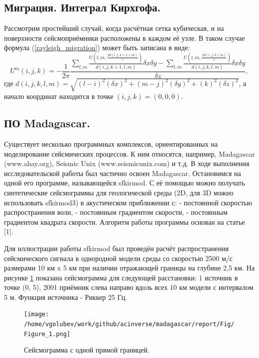 \documentclass{article}
\begin{document}
\subsection{Миграция. Интеграл Кирхгофа.}

Рассмотрим простейший случай, когда расчётная сетка кубическая, и на поверхности сейсмоприёмники расположены в каждом её узле.
В таком случае формула (\ref{rayleigh_migration}) может быть записана в виде:
\begin{equation}
\label{rayleigh_migration_discrete}
U^m(i,j,k) = -\frac{1}{2\pi}\frac{\sum\limits_{l,m} \frac{U(l,m,\frac{2d(i,j,k+1,l,m)}{c})}{d(i,j,k+1,l,m)}\delta x \delta y - \sum\limits_{l,m} \frac{U(l,m,\frac{2d(i,j,k,l,m)}{c})}{d(i,j,k,l,m)}\delta x \delta y}{\delta z},
\end{equation}
где $d(i,j,k,l,m)=\sqrt{(l-i)^2(\delta x)^2 + (m-j)^2(\delta y)^2  + (k)^2(\delta z)^2}$, а начало координат находится в точке $(i,j,k)=(0,0,0)$.

\subsection{ПО Madagascar.}

Существует несколько программных комплексов, ориентированных на моделирование сейсмических процессов.
К ним относятся, например, Madagascar (www.ahay.org), Seismic Unix (www.seismicunix.com) и т.д.
В ходе выполнения исследовательской работы был частично освоен Madagascar.
Остановимся на одной его программе, называющейся sfkirmod.
С её помощью можно получать синтетические сейсмограммы для геологической среды (2D, для 3D можно использовать sfkirmod3) в акустическом приближении с:
- постоянной скоростью распространения волн, - постоянным градиентом скорости, - постоянным градиентом квадрата скорости.
Алгоритм работы программы основан на статье [1].

Для иллюстрации работы sfkirmod был проведён расчёт распространения сейсмического сигнала в однородной модели среды со скоростью 2500 м/с размерами 10 км x 5 км при
наличии отражающей границы на глубине 2,5 км.
На рисунке \ref{seismo_1} показана сейсмограмма для следующей расстановки: 1 источник в точке (0, 5), 2001 приёмник слева направо вдоль всех 10 км модели с интервалом 5 м.
Функция источника - Риккер 25 Гц.

\begin{figure}[ht]
  \center
  \texttt{[image: /home/vgolubev/work/github/acinverse/madagascar/report/Fig/Figure\_1.png]}
  \caption{Сейсмограмма с одной прямой границей.}
\label{seismo_1}
\end{figure}
\end{document}
